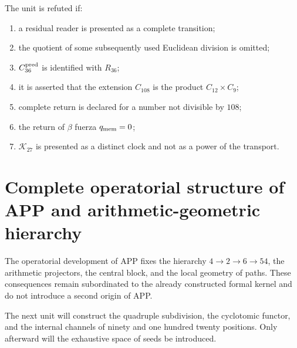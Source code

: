 \begin{criterion}
The unit is refuted if:
\begin{enumerate}
 \item a residual reader is presented as a complete transition;
 \item the quotient of some subsequently used Euclidean division is omitted;
 \item \(C_{36}^{\rm pred}\) is identified with \(R_{36}\);
 \item it is asserted that the extension \(C_{108}\) is the product
       \(C_{12}\times C_9\);
 \item complete return is declared for a number not divisible by \(108\);
 \item the return of \(\beta\) fuerza \(q_{\rm mem}=0\);
 \item \(\mathcal K_{27}\) is presented as a distinct clock and not as
       a power of the transport.
\end{enumerate}
\end{criterion}

\section{Complete operatorial structure of APP and arithmetic-geometric hierarchy}

The operatorial development of APP fixes the hierarchy
\(4\to2\to6\to54\), the arithmetic projectors, the central block, and the
local geometry of paths. These consequences remain subordinated to the
already constructed formal kernel and do not introduce a second origin of APP.

The next unit will construct the quadruple subdivision, the
cyclotomic functor, and the internal channels of ninety and one hundred twenty positions.
Only afterward will the exhaustive space of seeds be introduced.
